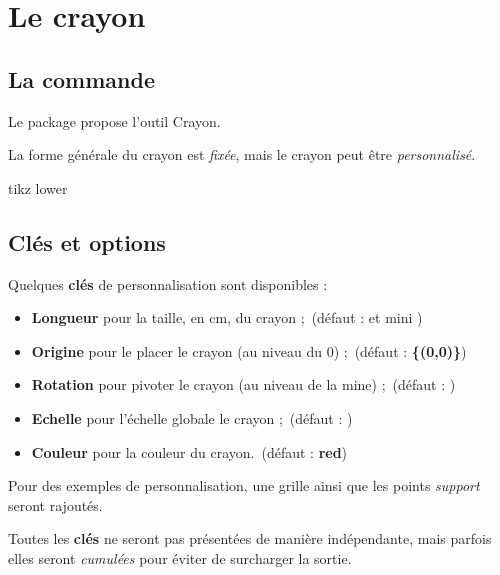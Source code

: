 \documentclass[french,a4paper,11pt]{article}
\newcommand\Cle[1]{{\bfseries\sffamily\textlangle #1\textrangle}}
\begin{document}
\section{Le crayon}

\subsection{La commande}

\begin{cautionblock}
Le package propose l'outil \textsf{Crayon}.

La forme générale du crayon est \textit{fixée}, mais le crayon peut être \textit{personnalisé}.
\end{cautionblock}

\begin{PresentationCode}{tikz lower}
\tkzCrayon
\end{PresentationCode}

\subsection{Clés et options}

\begin{tipblock}
Quelques \Cle{clés} de personnalisation sont disponibles :

\begin{itemize}
	\item \Cle{Longueur} pour la taille, en cm, du crayon ;\hfill~(défaut : \Cle{5} et mini \Cle{2.5})
	\item \Cle{Origine} pour le placer le crayon (au niveau du $0$) ;\hfill~(défaut : \Cle{\{(0,0)\}})
	\item \Cle{Rotation} pour pivoter le crayon (au niveau de la mine) ;\hfill~(défaut : \Cle{0})
	\item \Cle{Echelle} pour l'échelle globale le crayon ;\hfill~(défaut : \Cle{1})
	\item \Cle{Couleur} pour la couleur du crayon.\hfill~(défaut : \Cle{red})
\end{itemize}
\vspace*{-\baselineskip}\leavevmode
\end{tipblock}

\begin{noteblock}
Pour des exemples de personnalisation, une grille ainsi que les points \textit{support} seront rajoutés.

\smallskip

Toutes les \Cle{clés} ne seront pas présentées de manière indépendante, mais parfois elles seront \textit{cumulées} pour éviter de surcharger la sortie.
\end{noteblock}
\end{document}
